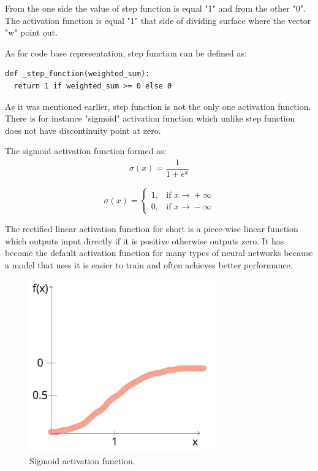 \documentclass{article}
\begin{document}
From the one side the value of step function is equal "1" and from the other "0". The activation function is equal "1" that side of dividing surface where the vector "w" point out.

As for code base representation, step function can be defined as:
\begin{lstlisting}
def _step_function(weighted_sum):
  return 1 if weighted_sum >= 0 else 0
\end{lstlisting}
   
As it was mentioned earlier, step function is not the only one activation function. There is for instance "sigmoid" activation function which unlike step function does not have discontinuity point at zero. 

The sigmoid activation function formed as:
\begin{align*}
\sigma(x) = \dfrac{1}{1+e^x}
\end{align*}

\[ \sigma(x) = \begin{cases} 1, & \mbox{if } x\mbox{$\xrightarrow{} + \infty$} \\ 0, & \mbox{if } x\mbox{$\xrightarrow{} - \infty$} \end{cases} \]

The rectified linear activation function for short is a piece-wise linear function which outputs input directly if it is positive otherwise outputs zero. It has become the default activation function for many types of neural networks because a model that uses it is easier to train and often achieves better performance.

\begin{figure}[h]
    \centering \includegraphics[width=8cm]{images/sigmoid_function.jpg}
    \caption {Sigmoid activation function.}
\end{figure}
\end{document}
